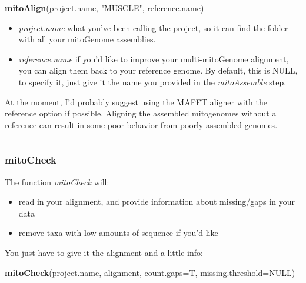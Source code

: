 \documentclass[
]{article}
\newenvironment{Shaded}{\begin{snugshade}}{\end{snugshade}}
\newcommand{\DataTypeTok}[1]{\textcolor[rgb]{0.13,0.29,0.53}{#1}}
\newcommand{\KeywordTok}[1]{\textcolor[rgb]{0.13,0.29,0.53}{\textbf{#1}}}
\newcommand{\NormalTok}[1]{#1}
\newcommand{\OtherTok}[1]{\textcolor[rgb]{0.56,0.35,0.01}{#1}}
\newcommand{\StringTok}[1]{\textcolor[rgb]{0.31,0.60,0.02}{#1}}
\providecommand{\tightlist}{%
  \setlength{\itemsep}{0pt}\setlength{\parskip}{0pt}}
\begin{document}
\begin{Shaded}
\begin{Highlighting}[]
\KeywordTok{mitoAlign}\NormalTok{(project.name, }\StringTok{"MUSCLE"}\NormalTok{, reference.name)}
\end{Highlighting}
\end{Shaded}

\begin{itemize}
\tightlist
\item
  \emph{project.name} what you've been calling the project, so it can
  find the folder with all your mitoGenome assemblies.\\
\item
  \emph{reference.name} if you'd like to improve your multi-mitoGenome
  alignment, you can align them back to your reference genome. By
  default, this is NULL, to specify it, just give it the name you
  provided in the \emph{mitoAssemble} step.
\end{itemize}

At the moment, I'd probably suggest using the MAFFT aligner with the
reference option if possible. Aligning the assembled mitogenomes without
a reference can result in some poor behavior from poorly assembled
genomes.

\begin{center}\rule{0.5\linewidth}{0.5pt}\end{center}

\hypertarget{mitocheck}{%
\subsubsection{mitoCheck}\label{mitocheck}}

The function \emph{mitoCheck} will:

\begin{itemize}
\tightlist
\item
  read in your alignment, and provide information about missing/gaps in
  your data\\
\item
  remove taxa with low amounts of sequence if you'd like
\end{itemize}

You just have to give it the alignment and a little info:

\begin{Shaded}
\begin{Highlighting}[]
\KeywordTok{mitoCheck}\NormalTok{(project.name, alignment, }\DataTypeTok{count.gaps=}\NormalTok{T, }\DataTypeTok{missing.threshold=}\OtherTok{NULL}\NormalTok{)}
\end{Highlighting}
\end{Shaded}
\end{document}
